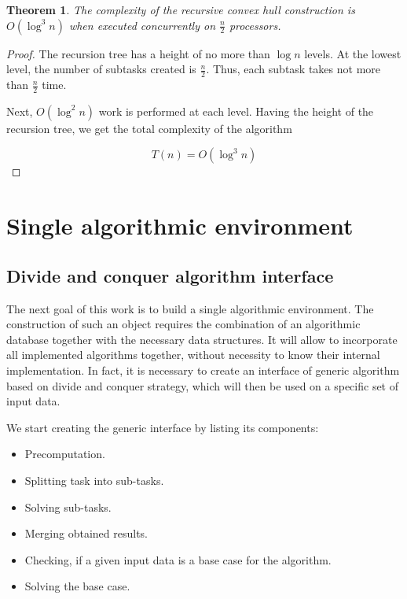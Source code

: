 \documentclass[conference]{IEEEtran}
\theoremstyle{plane}
\newtheorem{theorem}{Theorem}[section]
\begin{document}
\begin{theorem}
	The complexity of the recursive convex hull construction is $O(\log^3n)$ when executed concurrently on $\frac{n}{2}$ processors.
\end{theorem}

\begin{proof}
	The recursion tree has a height of no more than $\log n$ levels. At the lowest level, the number of subtasks created is $\frac{n}{2}$. Thus, each subtask takes not more than $\frac{n}{2}$ time.
	
	
	Next, $O(\log^2 n)$ work is performed at each level. Having the height of the recursion tree, we get the total complexity of the algorithm
	
	\begin{equation*}
	T(n) = O(\log^3 n)
	\end{equation*}
\end{proof}

\section{Single algorithmic environment}

\subsection{Divide and conquer algorithm interface}

The next goal of this work is to build a single algorithmic environment. The construction of such an object requires the combination of an algorithmic database together with the necessary data structures. It will allow to incorporate all implemented algorithms together, without necessity to know their internal implementation. In fact, it is necessary to create an interface of generic algorithm based on divide and conquer strategy, which will then be used on a specific set of input data.

We start creating the generic interface by listing its components:

\begin{itemize}
	\item 
	Precomputation.
	\item 
	Splitting task into sub-tasks.
	\item 
	Solving sub-tasks.
	\item 
	Merging obtained results.
	\item 
	Checking, if a given input data is a base case for the algorithm.
	\item 
	Solving the base case.
\end{itemize}
\end{document}
